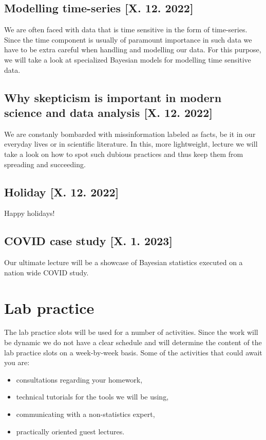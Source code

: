 \documentclass[fleqn,moreauthors,10pt]{ds_report}
\begin{document}
\subsection*{Modelling time-series [X. 12. 2022]}

We are often faced with data that is time sensitive in the form of time-series. Since the time component is usually of paramount importance in such data we have to be extra careful when handling and modelling our data. For this purpose, we will take a look at specialized Bayesian models for modelling time sensitive data.

\subsection*{Why skepticism is important in modern science and data analysis [X. 12. 2022]}

We are constanly bombarded with missinformation labeled as facts, be it in our everyday lives or in scientific literature. In this, more lightweight, lecture we will take a look on how to spot such dubious practices and thus keep them from spreading and succeeding.

\subsection*{Holiday [X. 12. 2022]}

Happy holidays!

\subsection*{COVID case study [X. 1. 2023]}

Our ultimate lecture will be a showcase of Bayesian statistics executed on a nation wide COVID study.

\section*{Lab practice}

The lab practice slots will be used for a number of activities. Since the work will be dynamic we do not have a clear schedule and will determine the content of the lab practice slots on a week-by-week basis. Some of the activities that could await you are:

\begin{itemize}
	\item consultations regarding your homework,
	\item technical tutorials for the tools we will be using,
	\item communicating with a non-statistics expert,
	\item practically oriented guest lectures.
\end{itemize}
\end{document}
